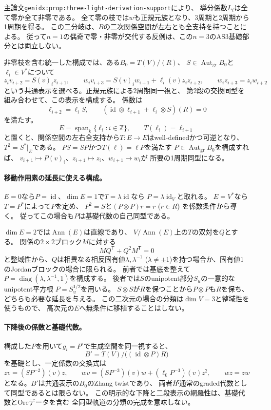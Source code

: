 \documentclass[11pt,a4paper]{ltjsarticle}
\begin{document}
主論文\texttt{genidx:prop:three-light-derivation-support}により、
導分係数$L_i$は全て零か全て非零である。
全て零の枝では$w$も正規元族となり、3周期と2周期から1周期を得る。
この二分岐は、$B$の二次関係空間が左右とも全支持を持つことによる。
従って$n=1$の偶奇で零・非零が交代する反例は、この$n=3$のAS3基礎部分とは両立しない。

非零枝を含む統一した構成では、ある$B_0=T(V)/(R)$、
$S\in\operatorname{Aut}_{\mathrm{gr}}B_0$と$\ell_i\in V^*$について
\[
z_i v_{i+2}=S(v)_i z_{i+1},\qquad
w_i v_{i+3}=S(v)_i w_{i+1}+\ell_i(v)z_i z_{i+2},\qquad
w_i z_{i+3}=z_i w_{i+2}
\]
という共通表示を選べる。正規元族による2周期同一視と、
第2段の交換同型を組み合わせて、この表示を構成する。
係数は
\[
\ell_{i+2}=\ell_i S,\qquad
(\operatorname{id}\otimes\ell_{i+1}+\ell_i\otimes S)(R)=0
\]
を満たす。
\[
E=\operatorname{span}_k\{\ell_i:i\in\mathbb Z\},\qquad
T(\ell_i)=\ell_{i+1}
\]
と置くと、関係空間の左右全支持から$T:E\to E$はwell-definedかつ可逆となり、
$T^2=S^*|_E$である。
$PS=SP$かつ$T(\ell)=\ell P$を満たす
$P\in\operatorname{Aut}_{\mathrm{gr}}B_0$を構成すれば、
$v_{i+1}\mapsto P(v)_i$、$z_{i+1}\mapsto z_i$、$w_{i+1}\mapsto w_i$が
所要の1周期同型になる。

\paragraph{移動作用素の延長に使える構成。}
$E=0$なら$P=\operatorname{id}$、$\dim E=1$で$T=\lambda\operatorname{id}$なら
$P=\lambda\operatorname{id}_V$と取れる。
$E=V^*$なら$T=P^*$によって$P$を定め、
$P^2=S$と$(P\otimes P)r=r$ ($r\in R$) を係数条件から導く。
従ってこの場合も$P$は基礎代数の自己同型である。

$\dim E=2$では$\operatorname{Ann}(E)$は直線であり、
$V/\operatorname{Ann}(E)$上の$T$の双対を$Q$とする。
関係の$2\times2$ブロック$M$に対する
\[
MQ^{\mathsf T}+Q^2M^{\mathsf T}=0
\]
と整域性から、$Q$は相異なる相反固有値$\lambda,\lambda^{-1}$
($\lambda\ne\pm1$)を持つ場合か、固有値1のJordanブロックの場合に限られる。
前者では基底を整えて$P=\operatorname{diag}(\lambda,\lambda^{-1},1)$を構成する。
後者では$S$のunipotent部分$S_u$の一意的なunipotent平方根
$P=S_u^{1/2}$を用いる。
$S\otimes S$が$R$を保つことから$P\otimes P$も$R$を保ち、
どちらも必要な延長を与える。
この二次元の場合の分類は$\dim V=3$と整域性を使うもので、
高次元の$E$へ無条件に移植することはしない。

\paragraph{下降後の係数と基礎代数。}
構成した$P$を用いて$g_i=P^i$で生成空間を同一視すると、
\[
B'=T(V)/\bigl((\operatorname{id}\otimes P)R\bigr)
\]
を基礎とし、一定係数の交換式は
\[
zv=(SP^{-2})(v)z,\qquad
wv=(SP^{-3})(v)w+(\ell_0P^{-3})(v)z^2,\qquad wz=zw
\]
となる。$B'$は共通表示の$B_0$のZhang twistであり、
両者が通常のgraded代数として同型であるとは限らない。
この明示的な下降と二段表示の網羅性は、基礎代数とOreデータを含む
全同型軌道の分類の完成を意味しない。
\end{document}
